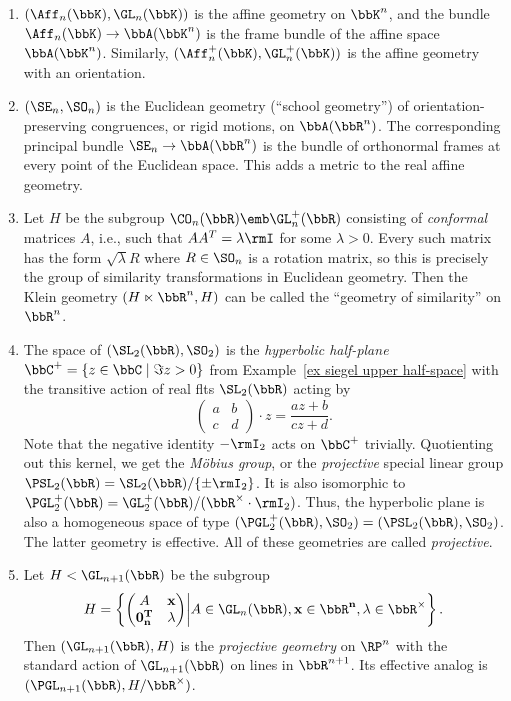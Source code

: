 \begin{example}\label{ex basic klein geometries}
    \begin{enumerate}
        \item $(\Aff_n(\bbK), \GL_n(\bbK))$ is the affine geometry on $\bbK^n$, and the bundle $\Aff_n(\bbK)\to \bbA(\bbK^n)$ is the frame bundle of the affine space $\bbA(\bbK^n)$. Similarly, $(\Aff_n^+(\bbK), \GL_n^+(\bbK))$ is the affine geometry with an orientation.

        \item $(\SE_n,\SO_n)$ is the Euclidean geometry (``school geometry'') of orientation-preserving congruences, or rigid motions, on $\bbA(\bbR^n)$. The corresponding principal bundle $\SE_n\to \bbA(\bbR^n)$ is the bundle of orthonormal frames at every point of the Euclidean space. This adds a metric to the real affine geometry.

        \item Let $H$ be the subgroup $\CO_n(\bbR)\emb\GL_n^+(\bbR)$ consisting of \emph{conformal} matrices $A$, i.e., such that $AA^T=\lambda \rmI$ for some $\lambda>0$. Every such matrix has the form $\sqrt{\lambda}R$ where $R\in\SO_n$ is a rotation matrix, so this is precisely the group of similarity transformations in Euclidean geometry. Then the Klein geometry $(H\ltimes \bbR^n,H)$ can be called the ``geometry of similarity'' on $\bbR^n$.
        
        \item The space of $(\SL_2(\bbR),\SO_2)$ is the \emph{hyperbolic half-plane} $\bbC^+=\{z\in \bbC\mid \Im z>0\}$ from Example~\ref{ex siegel upper half-space} with the transitive action of real \glspl{flt} $\SL_2(\bbR)$ acting by 
        \[\begin{pmatrix}
            a&b\\c&d
        \end{pmatrix}\cdot z=\frac{az+b}{cz+d}.\]
        Note that the negative identity $-\rmI_2$ acts on $\bbC^+$ trivially. Quotienting out this kernel, we get the \emph{M\"obius group}, or the \emph{projective} special linear group $\PSL_2(\bbR)=\SL_2(\bbR)\slash \{\pm \rmI_2\}$. It is also isomorphic to $\PGL^+_2(\bbR)=\GL^+_2(\bbR)\slash (\bbR^\times\cdot \rmI_2)$. Thus, the hyperbolic plane is also a homogeneous space of type $(\PGL^+_2(\bbR),\SO_2)=(\PSL_2(\bbR),\SO_2)$. The latter geometry is effective. All of these geometries are called \emph{projective}.

        \item Let $H<\GL_{n+1}(\bbR)$ be the subgroup
        \[H=\left\{\begin{pmatrix}
            A& \bf{x}\\ \bf{0}_n^T &\lambda
        \end{pmatrix}
        \middle| A\in\GL_n(\bbR),\bf{x}\in\bbR^n,\lambda\in \bbR^\times \right\}.\]
        Then $(\GL_{n+1}(\bbR),H)$ is the \emph{projective geometry} on $\RP^n$ with the standard action of $\GL_{n+1}(\bbR)$ on lines in $\bbR^{n+1}$. Its effective analog is $(\PGL_{n+1}(\bbR),H\slash \bbR^\times)$.
        

\end{enumerate}
\end{example}

